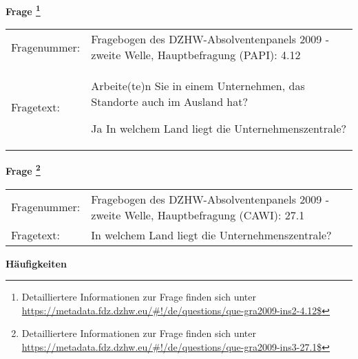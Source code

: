 				\vspace*{0.5cm}
                \noindent\textbf{Frage
	                \footnote{Detailliertere Informationen zur Frage finden sich unter
		              \url{https://metadata.fdz.dzhw.eu/\#!/de/questions/que-gra2009-ins2-4.12$}}}\\
				\begin{tabularx}{\hsize}{@{}lX}
					Fragenummer: &
					  Fragebogen des DZHW-Absolventenpanels 2009 - zweite Welle, Hauptbefragung (PAPI):
					  4.12
 \\
					Fragetext: & Arbeite(te)n Sie in einem Unternehmen, das Standorte auch im Ausland hat?\par  Ja In welchem Land liegt die Unternehmenszentrale? \\
				\end{tabularx}
				\vspace*{0.5cm}
                \noindent\textbf{Frage
	                \footnote{Detailliertere Informationen zur Frage finden sich unter
		              \url{https://metadata.fdz.dzhw.eu/\#!/de/questions/que-gra2009-ins3-27.1$}}}\\
				\begin{tabularx}{\hsize}{@{}lX}
					Fragenummer: &
					  Fragebogen des DZHW-Absolventenpanels 2009 - zweite Welle, Hauptbefragung (CAWI):
					  27.1
 \\
					Fragetext: & In welchem Land liegt die Unternehmenszentrale? \\
				\end{tabularx}





        		\vspace*{0.5cm}
                \noindent\textbf{Häufigkeiten}

